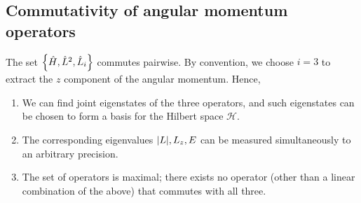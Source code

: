 \subsection{Commutativity of angular momentum operators}
The set \( \qty{ \hat H, \hat L^2, \hat L_i } \) commutes pairwise.
By convention, we choose \( i = 3 \) to extract the \( z \) component of the angular momentum.
Hence,
\begin{enumerate}
	\item We can find joint eigenstates of the three operators, and such eigenstates can be chosen to form a basis for the Hilbert space \( \mathcal H \).
	\item The corresponding eigenvalues \( \abs{L}, L_z, E \) can be measured simultaneously to an arbitrary precision.
	\item The set of operators is maximal; there exists no operator (other than a linear combination of the above) that commutes with all three.
\end{enumerate}

